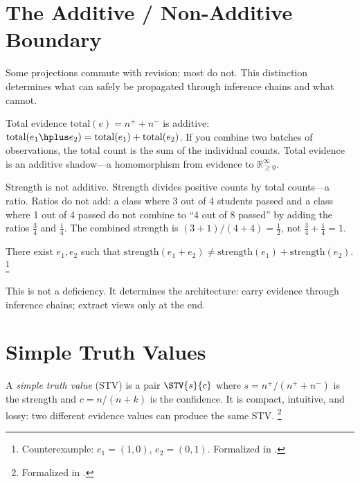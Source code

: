 \documentclass[11pt,openany]{report}
\begin{document}
\section{The Additive / Non-Additive Boundary}

Some projections commute with revision; most do not.  This
distinction determines what can safely be propagated through
inference chains and what cannot.

Total evidence $\mathrm{total}(e) = n^+ + n^-$ is additive:
$\mathrm{total}(e_1 \hplus e_2) = \mathrm{total}(e_1) +
\mathrm{total}(e_2)$.  If you combine two batches of observations,
the total count is the sum of the individual counts.  Total evidence
is an additive shadow---a homomorphism from evidence to
$\mathbb{R}_{\ge 0}^\infty$.

Strength is not additive.  Strength divides positive counts by
total counts---a ratio.  Ratios do not add: a class where 3 out of 4
students passed and a class where 1 out of 4 passed do not combine
to ``4 out of 8 passed'' by adding the ratios $\tfrac{3}{4}$ and
$\tfrac{1}{4}$.  The combined strength is $(3+1)/(4+4) = \tfrac{1}{2}$,
not $\tfrac{3}{4} + \tfrac{1}{4} = 1$.

\begin{theorem}
There exist $e_1, e_2$ such that
$\mathrm{strength}(e_1 + e_2) \ne
\mathrm{strength}(e_1) + \mathrm{strength}(e_2)$.%
\footnote{Counterexample: $e_1 = (1, 0)$, $e_2 = (0, 1)$.
Formalized in .}
\end{theorem}

\noindent
This is not a deficiency.  It determines the architecture: carry
evidence through inference chains; extract views only at the end.


\section{Simple Truth Values}

A \emph{simple truth value} (STV) is a pair $\STV{s}{c}$
where $s = n^+ / (n^+ + n^-)$ is the strength and
$c = n / (n + k)$ is the confidence.  It is compact, intuitive,
and lossy: two different evidence values can produce the same STV.%
\footnote{Formalized in
.}

\end{document}
